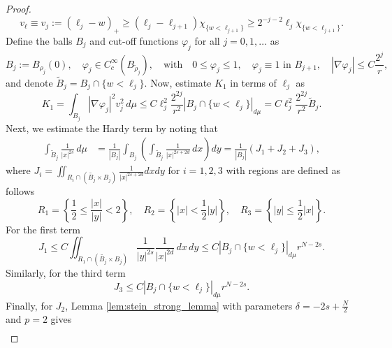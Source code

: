 \documentclass[11pt]{article}
\begin{document}
\begin{proof}
\begin{equation}\label{eq:vj_lower_bound}
v_{\ell} \equiv v_j := (\ell_j - w)_+ \geq (\ell_j - \ell_{j+1}) \chi_{\{ w < \ell_{j+1} \}} \geq 2^{-j-2} \ell_j \chi_{\{ w < \ell_{j+1} \}}.
\end{equation}
Define the balls $B_j$ and cut-off functions $\varphi_j$ for all \( j = 0, 1, \dots \) as
\begin{equation*}
B_j := B_{\rho_j}(0), \quad 
\varphi_j \in C_c^\infty(B_{\tilde{\rho}_j}), 
\quad \text{with} \quad 
0 \leq \varphi_j \leq 1, \quad 
\varphi_j \equiv 1 \text{ in } B_{{j+1}}, \quad 
|\nabla \varphi_j| \leq C\frac{2^{j}}{r},
\end{equation*}
and denote $\widetilde{B}_j = B_j \cap \{ w < \ell_j \}$.
Now, estimate $K_1$ in terms of $\ell_j$ as
\begin{equation*}
K_1 = \int_{B_j} |\nabla \varphi_j|^2 v_j^2 \, d\mu 
\leq C \ell_j^2   \frac{2^{2j}}{r^2} 
\left| B_j \cap \{ w < \ell_j \} \right|_{d\mu} = C \ell_j^2   \frac{2^{2j}}{r^2} \widetilde{B}_j.
\end{equation*}
Next, we estimate the Hardy term by noting that
\begin{align*}
\int_{\widetilde{B}_j} \frac{1}{|x|^{2s}} \, d\mu 
&= \frac{1}{|B_j|} \int_{B_j} \left( \int_{\widetilde{B}_j} 
\frac{1}{|x |^{2s + 2d}} \, dx \right) dy = \frac{1}{|B_j|} (J_1 + J_2 + J_3),
\end{align*}
where $J_i = \iint_{R_i \cap (\widetilde{B_j} \times B_j)} \frac{1}{|x|^{2s + 2d}} dx dy$ for $i = 1,2,3$ with regions are defined as follows
\begin{equation}\label{eq:region_breaking}
R_1 = \left\{ \frac{1}{2} \leq  \frac{|x|}{|y|} < 2 \right\}, \quad
R_2 = \left\{ |x| < \frac{1}{2}|y| \right\}, \quad
R_3 = \left\{ |y| \leq \frac{1}{2}|x| \right\}.
\end{equation}
For the first term
\begin{equation*}
J_1 \leq C \iint_{R_1 \cap (\widetilde{B_j} \times B_j)} \frac{1}{|y|^{2s}} 
  \frac{1}{|x|^{2d}} \, dx \, dy 
\leq C \left| B_j \cap \{ w < \ell_j \} \right|_{d\mu}   r^{N - 2s}.
\end{equation*}
Similarly, for the third term
\begin{equation*}
J_3 \leq C \left| B_j \cap \{ w < \ell_j \} \right|_{d\mu}   r^{N - 2s}.
\end{equation*}
Finally, for $J_2$, Lemma \ref{lem:stein_strong_lemma} with parameters $\delta = -2s + \frac{N}{2}$ and $p=2$ gives
\begin{align*} 

\end{align*}
\end{proof}
\end{document}
